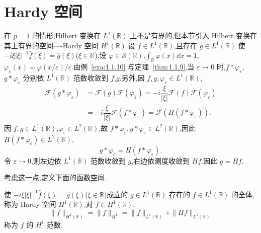 \section{Hardy 空间}\label{sec:1.12}


在 $p = 1$ 的情形,Hilbert 变换在 $L^{1}(\mathbb{R})$ 上不是有界的,但本节引入 Hilbert 变换在其上有界的空间----Hardy 空间 $H^{1}(\mathbb{R})$.设 $f \in L^{1}(\mathbb{R})$,且存在 $g \in L^{1}(\mathbb{R})$ 使 $-i\xi|\xi|^{-1}\hat{f}(\xi) = \hat{g}(\xi)$($\xi \in \mathbb{R}$).设 $\varphi \in \mathcal{S}(\mathbb{R})$,$\int_{\mathbb{R}}\varphi(x)\dd x = 1$,$\varphi_{\varepsilon}(x) = \varphi(x/\varepsilon)/\varepsilon$.由例~\ref{exa:1.1.10} 与定理~\ref{thm:1.1.9},当 $\varepsilon \to 0$ 时,$f * \varphi_{\varepsilon}$,$g * \varphi_{\varepsilon}$ 分别依 $L^{1}(\mathbb{R})$ 范数收敛到 $f$,$g$.另外,因 $f, g, \varphi_{\varepsilon} \in L^{1}(\mathbb{R})$,
\begin{align*}
\mathcal{F}(g * \varphi_{\varepsilon}) & = \mathcal{F}(g)\mathcal{F}(\varphi_{\varepsilon}) = -i\dfrac{\xi}{|\xi|}\mathcal{F}(f)\mathcal{F}(\varphi_{\varepsilon}) \\
& = -i\dfrac{\xi}{|\xi|}\mathcal{F}(f * \varphi_{\varepsilon}) = \mathcal{F}\left(H(f * \varphi_{\varepsilon})\right).
\end{align*}
因 $f, g \in L^{1}(\mathbb{R})$,$\varphi_{\varepsilon} \in L^{2}(\mathbb{R})$,故 $f * \varphi_{\varepsilon}, g * \varphi_{\varepsilon} \in L^{2}(\mathbb{R})$,因此 $H(f * \varphi_{\varepsilon}) \in L^{2}(\mathbb{R})$,
\begin{equation*}
g * \varphi_{\varepsilon} = H(f * \varphi_{\varepsilon}).
\end{equation*}
令 $\varepsilon \to 0$,则左边依 $L^{1}(\mathbb{R})$ 范数收敛到 $g$,右边依测度收敛到 $Hf$.因此 $g = Hf$.

考虑这一点,定义下面的函数空间.

\begin{definition}\label{def:1.12.1}
使 $-i\xi|\xi|^{-1}\hat{f}(\xi) = \hat{g}(\xi)$($\xi \in \mathbb{R}$)成立的 $g \in L^{1}(\mathbb{R})$ 存在的 $f \in L^{1}(\mathbb{R})$ 的全体,称为 Hardy 空间 $H^{1}(\mathbb{R})$.对 $f \in H^{1}(\mathbb{R})$,
\begin{equation*}
\| f \|_{H^{1}(\mathbb{R})} = \| f \|_{H^{1}} = \| f \|_{L^{1}(\mathbb{R})} + \| Hf \|_{L^{1}(\mathbb{R})}
\end{equation*}
称为 $f$ 的 $H^{1}$ 范数.
\end{definition}

